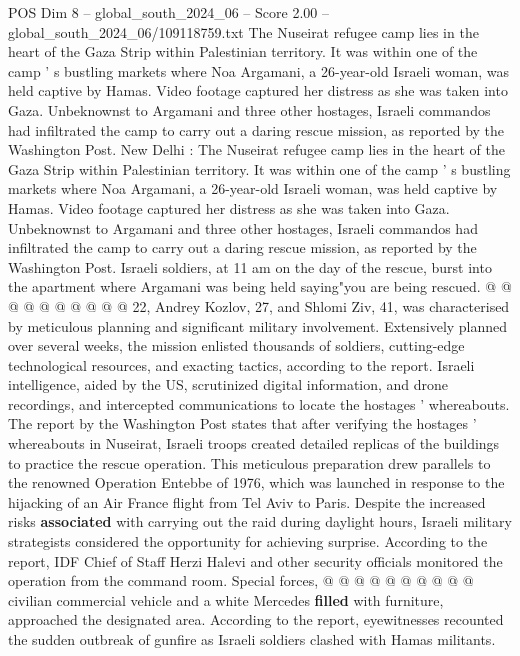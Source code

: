 \begin{textsample}{POS Dim 8 – global\_south\_2024\_06 – Score 2.00 – global\_south\_2024\_06/109118759.txt}  \label{ex:f8_pos_409}
The Nuseirat refugee camp lies in the heart of the Gaza Strip within Palestinian territory.
It was within one of the camp ' s bustling markets where Noa Argamani, a 26-year-old Israeli woman, was held captive by Hamas.
Video footage captured her distress as she was taken into Gaza.
Unbeknownst to Argamani and three other hostages, Israeli commandos had infiltrated the camp to carry out a daring rescue mission, as reported by the Washington Post.
New Delhi : The Nuseirat refugee camp lies in the heart of the Gaza Strip within Palestinian territory.
It was within one of the camp ' s bustling markets where Noa Argamani, a 26-year-old Israeli woman, was held captive by Hamas.
Video footage captured her distress as she was taken into Gaza.
Unbeknownst to Argamani and three other hostages, Israeli commandos had infiltrated the camp to carry out a daring rescue mission, as reported by the Washington Post.
Israeli soldiers, at 11 am on the day of the rescue, burst into the apartment where Argamani was being held saying"you are being rescued. @ @ @ @ @ @ @ @ @ @ 22, Andrey Kozlov, 27, and Shlomi Ziv, 41, was characterised by meticulous planning and significant military involvement.
Extensively planned over several weeks, the mission enlisted thousands of soldiers, cutting-edge technological resources, and exacting tactics, according to the report.
Israeli intelligence, aided by the US, scrutinized digital information, and drone recordings, and intercepted communications to locate the hostages ' whereabouts.
The report by the Washington Post states that after verifying the hostages ' whereabouts in Nuseirat, Israeli troops created detailed replicas of the buildings to practice the rescue operation.
This meticulous preparation drew parallels to the renowned Operation Entebbe of 1976, which was launched in response to the hijacking of an Air France flight from Tel Aviv to Paris.
Despite the increased risks \textbf{associated} with carrying out the raid during daylight hours, Israeli military strategists considered the opportunity for achieving surprise.
According to the report, IDF Chief of Staff Herzi Halevi and other security officials monitored the operation from the command room.
Special forces, @ @ @ @ @ @ @ @ @ @ civilian commercial vehicle and a white Mercedes \textbf{filled} with furniture, approached the designated area.
According to the report, eyewitnesses recounted the sudden outbreak of gunfire as Israeli soldiers clashed with Hamas militants.

\end{textsample}
